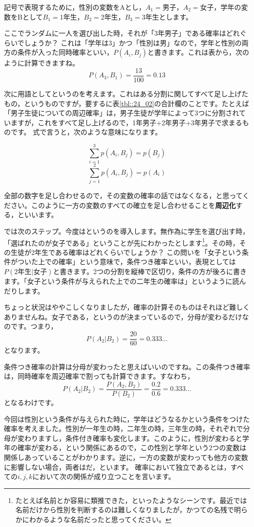 \documentclass{ltjsbook}
\begin{document}
記号で表現するために，性別の変数をAとし，$A_1=$男子，$A_2=$女子，学年の変数をBとして$B_1=$1年生，$B_2=$2年生，$B_3=$3年生とします。

ここでランダムに一人を選び出した時，それが「3年男子」である確率はどれぐらいでしょうか？ これは「学年は3」かつ「性別は男」なので，学年と性別の両方の条件が入った同時確率といい，$P(A_i,B_j)$と書きます。これは表から，次のように計算できますね。
\[ P(A_3,B_1)= \frac{13}{100}=0.13 \]

次に用語としてというのを考えます。これはある分割に関してすべて足し上げたもの，というものですが，要するに表\ref{tbl::24_02}の合計欄のことです。たとえば「男子生徒についての周辺確率」は，男子生徒が学年によって3つに分割されていますが，これをすべて足し上げるので，1年男子+2年男子+3年男子で求まるものです。
式で言うと，次のような意味になります。

\[ \sum_{i=1}^3 p(A_i,B_j) = p(B_j) \]
\[ \sum_{j=1}^2 p(A_i,B_j) = p(A_i) \]

全部の数字を足し合わせるので，その変数の確率の話ではなくなる，と思ってください。このように一方の変数のすべての確立を足し合わせることを\textbf{周辺化}する，といいます。

では次のステップ。今度はというのを導入します。無作為に学生を選び出す時，「選ばれたのが女子である」ということが先にわかったとします\footnote{たとえば名前とか容易に類推できた，といったようなシーンです。最近では名前だけから性別を判断するのは難しくなりましたが，かつての名残で明らかにわかるような名前だったと思ってください。}。その時，その生徒が2年生である確率はどれくらいでしょうか？ この問いを「女子という条件がついた上での確率」という意味で，条件つき確率といい，表現としては$P(\mbox{2年生}|\mbox{女子})$と書きます。2つの分割を縦棒で区切り，条件の方が後ろに書きます。「女子という条件が与えられた上での二年生の確率は」というように読んだりします。

ちょっと状況はややこしくなりましたが，確率の計算そのものはそれほど難しくありませんね。女子である，というのが決まっているので，分母が変わるだけなのです。つまり，
\[P(A_2|B_2)=\frac{20}{60}=0.333... \]
となります。

条件つき確率の計算は分母が変わったと思えばいいのですね。この条件つき確率は，同時確率を周辺確率で割っても計算できます。すなわち，
\[ P(A_2|B_2) = \frac{P(A_2,B_2)}{P(B_2)}=\frac{0.2}{0.6}=0.333... \]
となるわけです。

今回は性別という条件が与えられた時に，学年はどうなるかという条件をつけた確率を考えました。性別が一年生の時，二年生の時，三年生の時，それぞれで分母が変わりますし，条件付き確率も変化します。このように，性別が変わると学年の確率が変わる，という関係にあるので，この性別と学年という2つの変数は関係しあっていることがわかります。逆に，一方の変数が変わっても他方の変数に影響しない場合，両者はだ，といます。
確率において独立であるとは，すべての$i,j,k$において次の関係が成り立つことを言います。
\end{document}
